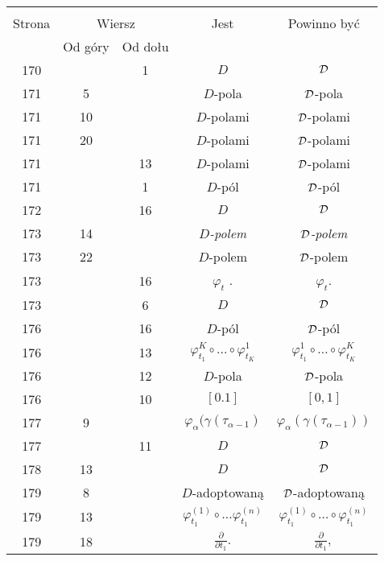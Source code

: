 \documentclass[a4paper,11pt]{article}
\begin{document}
\begin{center}
  \begin{tabular}{|c|c|c|c|c|}
    \hline
    & \multicolumn{2}{c|}{} & & \\
    Strona & \multicolumn{2}{c|}{Wiersz} & Jest
                              & Powinno być \\ \cline{2-3}
    & Od góry & Od dołu & & \\
    \hline
    170 & &  1 & $D$ & $\mathcal{D}$ \\
    171 &  5 & & $D$-pola & $\mathcal{D}$-pola \\
    171 & 10 & & $D$-polami & $\mathcal{D}$-polami \\
    171 & 20 & & $D$-polami & $\mathcal{D}$-polami \\
    171 & & 13 & $D$-polami & $\mathcal{D}$-polami \\
    171 & &  1 & $D$-pól & $\mathcal{D}$-pól \\
    172 & & 16 & $D$ & $\mathcal{D}$ \\
    173 & 14 & & \textit{$D$-polem} & \textit{$\mathcal{D}$-polem} \\
    173 & 22 & & $D$-polem & $\mathcal{D}$-polem \\
    173 & & 16 & $\varphi_{ t }$ . & $\varphi_{ t }$. \\
    173 & &  6 & $D$ & $\mathcal{D}$ \\
    176 & & 16 & $D$-pól & $\mathcal{D}$-pól \\
    176 & & 13 & $\varphi_{ t_{ 1 } }^{ K } \circ \ldots \circ \varphi_{ t_{ K } }^{ 1 }$
           & $\varphi_{ t_{ 1 } }^{ 1 } \circ \ldots \circ \varphi_{ t_{ K } }^{ K }$ \\
    176 & & 12 & $D$-pola & $\mathcal{D}$-pola \\
    176 & & 10 & $[ 0. 1 ]$ & $[ 0, 1 ]$ \\
    177 &  9 & & $\varphi_{ \alpha }( \gamma ( \tau_{ \alpha - 1 } )$
           & $\varphi_{ \alpha }( \gamma ( \tau_{ \alpha - 1 } ) )$ \\
    177 & & 11 & $D$ & $\mathcal{D}$ \\
    178 & 13 & & $D$ & $\mathcal{D}$ \\
    179 &  8 & & $D$-adoptowaną & $\mathcal{D}$-adoptowaną \\
    179 & 13 & & $\varphi_{ t_{ 1 } }^{ ( 1 ) } \circ \ldots \varphi_{ t_{ 1 } }^{ ( n ) }$
           & $\varphi_{ t_{ 1 } }^{ ( 1 ) } \circ \ldots \circ \varphi_{ t_{ 1 } }^{ ( n ) }$
    \\
    179 & 18 & & $\frac{ \partial }{ \partial t_{ 1 } }.$
           & $\frac{ \partial }{ \partial t_{ 1 } },$ \\

\end{tabular}
\end{center}
\end{document}
